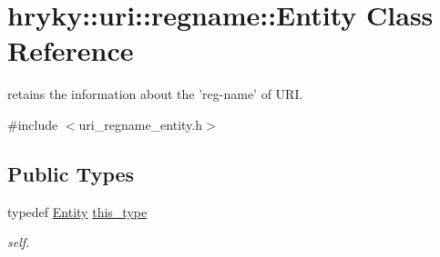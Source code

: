 \hypertarget{classhryky_1_1uri_1_1regname_1_1_entity}{\section{hryky\-:\-:uri\-:\-:regname\-:\-:Entity Class Reference}
\label{classhryky_1_1uri_1_1regname_1_1_entity}
}


retains the information about the 'reg-\/name' of U\-R\-I.  




{\ttfamily \#include $<$uri\-\_\-regname\-\_\-entity.\-h$>$}

\subsection*{Public Types}
\begin{DoxyCompactItemize}
\item 
\hypertarget{classhryky_1_1uri_1_1regname_1_1_entity_ab3e7322abf5cdcaca367ea56179c1862}{typedef \hyperlink{classhryky_1_1uri_1_1regname_1_1_entity}{Entity} \hyperlink{classhryky_1_1uri_1_1regname_1_1_entity_ab3e7322abf5cdcaca367ea56179c1862}{this\-\_\-type}}\label{classhryky_1_1uri_1_1regname_1_1_entity_ab3e7322abf5cdcaca367ea56179c1862}

\begin{DoxyCompactList}\small\item\em self. \end{DoxyCompactList}\end{DoxyCompactItemize}
